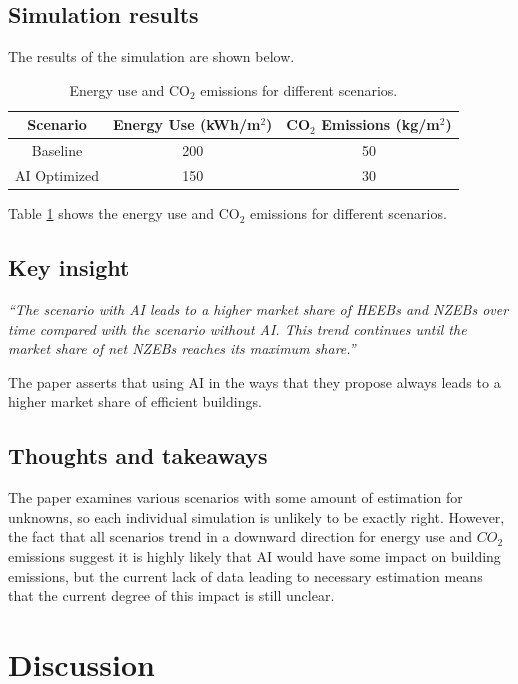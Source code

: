 \documentclass[conference,a4paper]{IEEEtran}
\begin{document}
\subsection*{Simulation results}
The results of the simulation are shown below.

\begin{table}
\centering
\begin{tabular}{|c|c|c|}
\hline
\textbf{Scenario} & \textbf{Energy Use (kWh/m$^2$)} & \textbf{CO$_2$ Emissions (kg/m$^2$)} \\
\hline 
Baseline & 200 & 50 \\
\hline
AI Optimized & 150 & 30 \\
\hline
\end{tabular}
\caption{Energy use and CO$_2$ emissions for different scenarios.}
\label{tab:energy-emissions}
\end{table}

Table \ref{tab:energy-emissions} shows the energy use and CO$_2$ emissions for different scenarios.


\subsection*{Key insight}

\textit{“The scenario with AI leads to a higher market share of HEEBs and NZEBs over time compared with the scenario without AI. This trend continues until the market share of net NZEBs reaches its maximum share.”}

The paper asserts that using AI in the ways that they propose always leads to a higher market share of efficient buildings. 

\subsection*{Thoughts and takeaways}
The paper examines various scenarios with some amount of estimation for unknowns, so each individual simulation is unlikely to be exactly right. However, the fact that all scenarios trend in a downward direction for energy use and $CO_2$ emissions suggest it is highly likely that AI would have some impact on building emissions, but the current lack of data leading to necessary estimation means that the current degree of this impact is still unclear.


\section*{Discussion}
\end{document}
